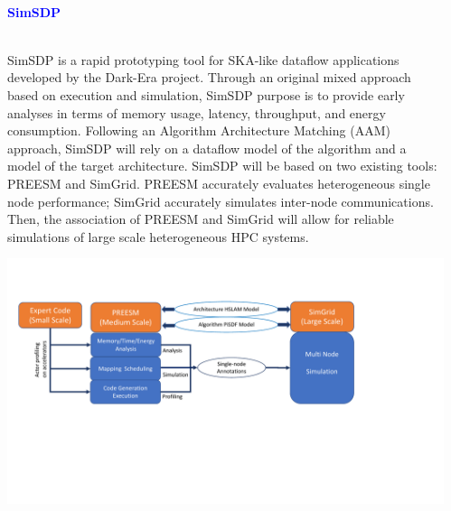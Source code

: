 \documentclass{beamer}
\renewenvironment{block}[1]{%
\begin{Sbox}%
\begin{minipage}[t]{\textwidth}
~\\
\textcolor{blue}{\quad #1}~\\
~\\%
\vspace{0.5cm}
} 
{%
\end{minipage}
\end{Sbox}\Ovalbox{\TheSbox}%
}
\begin{document}
{\begin{columns}[t]
\begin{column}{.49\linewidth}
\begin{block}{\large \textbf{SimSDP}}
 \begin{minipage}{0.95\textwidth}
 SimSDP is a rapid prototyping tool for SKA-like dataflow applications developed by the Dark-Era project. Through an original mixed approach based on execution and simulation, SimSDP purpose is to provide early analyses in terms of memory usage, latency, throughput, and energy consumption. Following an Algorithm Architecture Matching (AAM) approach, SimSDP will rely on a dataflow model of the algorithm and a model of the target architecture. SimSDP will be based on two existing tools: PREESM and SimGrid. PREESM accurately evaluates heterogeneous single node performance; SimGrid accurately simulates inter-node communications. Then, the association of PREESM and SimGrid will allow for reliable simulations of large scale heterogeneous HPC systems.
 \\
 \begin{center}
    \includegraphics[width=\textwidth ]{SimSDP_overview} %
    \end{center}
 
 \end{minipage}

 
\end{block}


 
\end{column}
\begin{column}{.49\linewidth}



\end{column}
\end{columns}}
\end{document}
